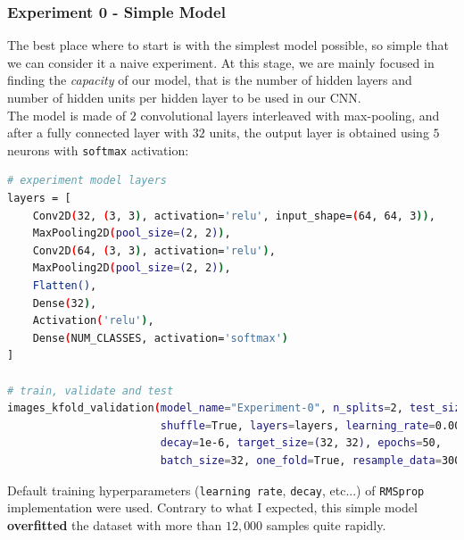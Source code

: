 \documentclass[11pt,a4paper]{article}
\begin{document}
\subsubsection{Experiment 0 - Simple Model}
The best place where to start is with the simplest model possible, so simple that we can consider it a naive experiment. At this stage, we are mainly focused in finding the \textit{capacity} of our model, that is the number of hidden layers and number of hidden units per hidden layer to be used in our CNN.\\
The model is made of $2$ convolutional layers interleaved with max-pooling, and after a fully connected layer with $32$ units, the output layer is obtained using $5$ neurons with \texttt{softmax} activation:
\begin{lstlisting}[language=bash,frame=single]
# experiment model layers
layers = [
    Conv2D(32, (3, 3), activation='relu', input_shape=(64, 64, 3)),
    MaxPooling2D(pool_size=(2, 2)),
    Conv2D(64, (3, 3), activation='relu'),
    MaxPooling2D(pool_size=(2, 2)),
    Flatten(),
    Dense(32),
    Activation('relu'),
    Dense(NUM_CLASSES, activation='softmax')
]

# train, validate and test
images_kfold_validation(model_name="Experiment-0", n_splits=2, test_size=0.10,
                        shuffle=True, layers=layers, learning_rate=0.001,
                        decay=1e-6, target_size=(32, 32), epochs=50,
                        batch_size=32, one_fold=True, resample_data=3000)
\end{lstlisting}
Default training hyperparameters (\texttt{learning rate}, \texttt{decay}, etc...) of \texttt{RMSprop} implementation were used. Contrary to what I expected, this simple model \textbf{overfitted} the dataset with more than $12,000$ samples quite rapidly.
\end{document}
